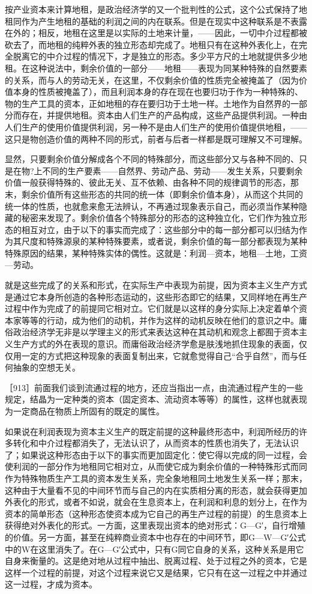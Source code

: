按产业资本来计算地租，是政治经济学的又一个批判性的公式，这个公式保持了地租同作为产生地租的基础的利润之间的内在联系。但是在现实中这种联系是不表露在外的；相反，地租在这里是以实际的土地来计量，——因此，一切中介过程都被砍去了，而地租的纯粹外表的独立形态却完成了。地租只有在这种外表化上，在完全脱离它的中介过程的情况下，才是独立的形态。多少平方尺的土地就提供多少地租。在这种说法中，剩余价值的一部分——地租——表现为同某种特殊的自然要素的关系，而与人的劳动无关，在这里，不仅剩余价值的性质完全被掩盖了（因为价值本身的性质被掩盖了），而且利润本身的存在现在也要归功于作为一种特殊的、物的生产工具的资本，正如地租的存在要归功于土地一样。土地作为自然界的一部分而存在，并提供地租。资本由人们生产的产品构成，这些产品提供利润。一种由人们生产的使用价值提供利润，另一种不是由人们生产的使用价值提供地租，——这只是物创造价值的两种不同的形式，前者与后者一样都是既可理解又不可理解。

显然，只要剩余价值分解成各个不同的特殊部分，而这些部分又与各种不同的、只是在物?上不同的生产要素——自然界、劳动产品、劳动——发生关系，只要剩余价值一般获得特殊的、彼此无关、互不依赖、由各种不同的规律调节的形态，那末，剩余价值所有这些形态的共同的统一体（即剩余价值本身），从而这个共同的统一体的性质，也就愈来愈无法辨认，不再通过现象表示自己，而必须当作某种隐藏的秘密来发现了。剩余价值各个特殊部分的形态的这种独立化，它们作为独立形态的相互对立，由于以下的事实而完成了：这些部分中的每一部分都可以归结为作为其尺度和特殊源泉的某种特殊要素，或者说，剩余价值的每一部分都表现为某种特殊原因的结果，某种特殊实体的偶性。这就是：利润—资本，地租—土地，工资—劳动。

就是这些完成了的关系和形式，在实际生产中表现为前提，因为资本主义生产方式是通过它本身所创造的各种形态运动的，这些形态即它的结果，又同样地在再生产过程中作为完成了的前提同它相对立。它们就是以这样的身分实际上决定着单个资本家等等的行动，成为他们的动机，并作为这样的动机反映在他们的意识之中。庸俗政治经济学无非是以学理主义的形式来表达这种在其动机和观念上都囿于资本主义生产方式的外在表现的意识。而庸俗政治经济学愈是肤浅地抓住现象的表面，仅仅用一定的方式把这种现象的表面复制出来，它就愈觉得自己“合乎自然”，而与任何抽象的空想无关。

［913］前面我们谈到流通过程的地方，还应当指出一点，由流通过程产生的一些规定，结晶为一定种类的资本（固定资本、流动资本等等）的属性，这样也就表现为一定商品在物质上所固有的既定的属性。

如果说在利润表现为资本主义生产的既定前提的这种最终形态中，利润所经历的许多转化和中介过程都消失了，无法认识了，从而资本的性质也消失了，无法认识了；如果说这种形态由于以下的事实而更加固定化：使它得以完成的同一过程，会使利润的一部分作为地租同它相对立，从而使它成为剩余价值的一种特殊形式而同作为特殊物质生产工具的资本发生关系，完全象地租同土地发生关系一样；那末，这种由于大量看不见的中间环节而与自己的内在实质相分离的形态，就会获得更加外表化的形式，或者不如说，就会在生息资本上，在利润和利息的划分上，在作为资本的简单形态（这种形态使资本成为它自己的再生产过程的前提）的生息资本上获得绝对外表化的形式。一方面，这里表现出资本的绝对形式：G—G′，自行增殖的价值。另一方面，甚至在纯粹商业资本中也存在的中间环节，即G—W—G′公式中的W在这里消失了。在G—G′公式中，只有G同它自身的关系，这种关系是用它自身来衡量的。这是绝对地从过程中抽出、脱离过程、处于过程之外的资本，它是这样一个过程的前提，对这个过程来说它又是结果，它只有在这一过程之中并通过这一过程，才成为资本。

